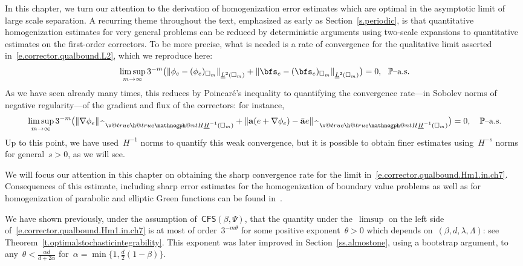 \documentclass[11pt,twoside]{article} %
\makeatletter
\let\oldsquare\square %
\renewcommand{\square}{\oldsquare}
\numberwithin{equation}{section}
\theoremstyle{definition}
\let\originalleft\left
\let\originalright\right
\renewcommand{\left}{\mathopen{}\mathclose\bgroup\originalleft}
\renewcommand{\right}{\aftergroup\egroup\originalright}
\renewcommand*{\hat}{\widehat}
\renewcommand{\a}{\mathbf{a}}
\newcommand{\ahom}{\bar{\a}}
\newcommand{\cu}{\square}
\renewcommand{\P}{\mathbb{P}}
\newcommand{\negphantom}{\v@true\h@true\negph@nt}
\newcommand{\negph@nt}{\ifmmode\expandafter\mathpalette 
  \expandafter\mathnegph@nt\else\expandafter\makenegph@nt\fi}
\newcommand{\makenegph@nt}[1]{%
  \setbox\z@\hbox{\color@begingroup#1\color@endgroup}\finnegph@nt}
\newcommand{\finnegph@nt}{%
  \setbox\tw@\null 
  \ifv@ \ht\tw@\ht\z@\dp\tw@\dp\z@\fi \ifh@\wd\tw@-\wd\z@\fi\box\tw@}
\newcommand{\mathnegph@nt}[2]{%
  \setbox\z@\hbox{$\m@th #1{#2}$}\finnegph@nt}
\newcommand{\Hminusul}{\hat{\phantom{H}}\negphantom{H}\underline{H}^{-1}}
\newcommand{\CFS}{\mathsf{CFS}}
\makeatother
\begin{document}
In this chapter, we turn our attention to the derivation of homogenization error estimates which are optimal in the asymptotic limit of large scale separation. A recurring theme throughout the text, emphasized as early as Section~\ref{s.periodic}, is that quantitative homogenization estimates for very general problems can be reduced by deterministic arguments using two-scale expansions to quantitative estimates on the first-order correctors. To be more precise, what is needed is a rate of convergence for the qualitative limit asserted in~\eqref{e.corrector.qualbound.L2}, which we reproduce here: 
\begin{equation}
\label{e.corrector.qualbound.L2.in.ch7}
\limsup_{m\to \infty}
3^{-m} 
\bigl(
\left\|  \phi_e - (\phi_e)_{\cu_m} \right\|_{\underline{L}^{2}(\cu_m)}
+
\left\|  \bfs_e - (\bfs_e)_{\cu_m} \right\|_{\underline{L}^{2}(\cu_m)}
\bigr) = 0,
\ \ \mbox{$\P$--a.s.}
\end{equation}
As we have seen already many times, this reduces by Poincar\'e's inequality to quantifying the convergence rate---in  Sobolev norms of negative regularity---of the gradient and flux of the correctors: for instance, 
\begin{equation}
\label{e.corrector.qualbound.Hm1.in.ch7}
\limsup_{m\to \infty}
3^{-m} 
\bigl(
\| \nabla \phi_{e} \|_{\Hminusul(\cu_m)} 
+
\| \a (e +\nabla \phi_{e}) - \ahom e \|_{\Hminusul(\cu_m)} 
\bigr) = 0,
\quad \mbox{$\P$--a.s.}
\end{equation}
Up to this point, we have used~$H^{-1}$ norms to quantify this weak convergence, but it is possible to obtain finer estimates using~$H^{-s}$ norms for general~$s>0$, as we will see. 

\smallskip

We will focus our attention in this chapter on obtaining the sharp convergence rate for the limit in~\eqref{e.corrector.qualbound.Hm1.in.ch7}. Consequences of this estimate, including sharp error estimates for the homogenization of boundary value problems as well as for homogenization of parabolic and elliptic Green functions  can be found in~\cite[Chapters 6, 8 \& 9]{AKMBook}. 

\smallskip

We have shown previously, under the assumption of~$\CFS(\beta,\Psi)$, that the quantity under the~$\limsup$ on the left side of~\eqref{e.corrector.qualbound.Hm1.in.ch7} is at most of order~$3^{-m\theta}$ for some positive exponent~$\theta>0$ which depends on~$(\beta,d,\lambda,\Lambda)$: see Theorem~\ref{t.optimalstochasticintegrability}. This exponent was later improved in Section~\ref{ss.almostone}, using a bootstrap argument, to any~$\theta < \frac{\alpha d}{d+2\alpha}$ for~$\alpha = \min\{ 1 , \frac d2(1-\beta)\}$. 
\end{document}
